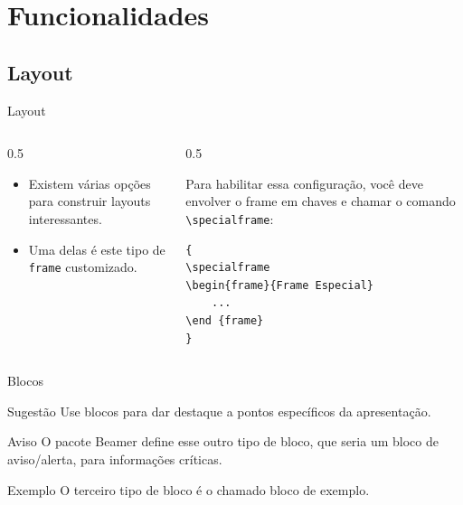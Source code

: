 \documentclass{beamer}
\begin{document}
\section{Funcionalidades}

\tocframe[sectionstyle=show/shaded,subsectionstyle=show/show/shaded]

\subsection{Layout}

{
\specialframe
\begin{frame}[fragile]{Layout}
    \begin{columns}
        \begin{column}{0.5\textwidth}
            \begin{itemize}
                \item Existem várias opções para construir layouts interessantes.
                \item Uma delas é este tipo de \texttt{frame} customizado.
            \end{itemize}
        \end{column}
        \begin{column}{0.5\textwidth}
            \begin{block}{}
                Para habilitar essa configuração, você deve envolver o frame em chaves e chamar o comando \verb|\specialframe|:
                \begin{lstlisting}[language=Tex, caption=\lstcaption{Configuração de frame especial}, label=lst:special]
{
\specialframe
\begin{frame}{Frame Especial}
    ...
\end {frame}
}\end{lstlisting}
                \vspace{-3mm}
            \end{block}
        \end{column}
    \end{columns}
\end{frame}
}

\begin{frame}{Blocos}
    \begin{block}{Sugestão}
        Use blocos para dar destaque a pontos específicos da apresentação.
    \end{block}
    
    \begin{alertblock}{Aviso}
        O pacote Beamer define esse outro tipo de bloco, que seria um bloco de aviso/alerta, para informações críticas.
    \end{alertblock}
    
    \begin{exampleblock}{Exemplo}
        O terceiro tipo de bloco é o chamado bloco de exemplo.
    \end{exampleblock}
\end{frame}
\end{document}
